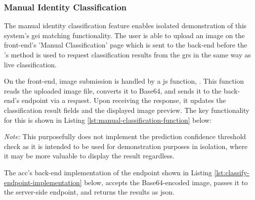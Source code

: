\subsubsection{Manual Identity Classification}
\label{subsubsec:manual-classification-implementation}

The manual identity classification feature enables isolated demonstration of this system's \ac{gei} matching functionality.
The user is able to upload an image on the front-end's 'Manual Classification' page which is sent to the back-end before the 's  method is used to request classification results from the \ac{grs} in the same way as live classification.

On the front-end, image submission is handled by a \ac{js} function, . This function reads the uploaded image file, converts it to Base64, and sends it to the back-end's  endpoint via a  request. 
Upon receiving the response, it updates the classification result fields and the displayed image preview. The key functionality for this is shown in Listing \ref{lst:manual-classification-function} below: 

\label{lst:manual-classification-function} \vspace{10pt}

\textit{Note:} This purposefully does not implement the prediction confidence threshold check as it is intended to be used for demonstration purposes in isolation, where it may be more valuable to display the result regardless.

The \ac{acc}'s back-end implementation of the  endpoint shown in Listing \ref{lst:classify-endpoint-implementation} below, accepts the Base64-encoded image, passes it to the server-side  endpoint, and returns the results as \ac{json}.

